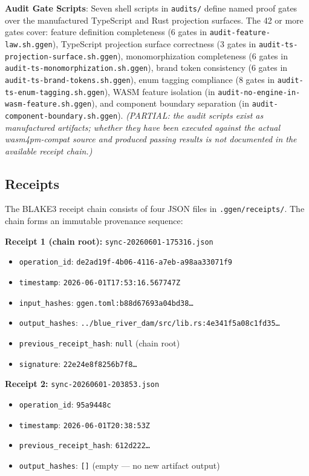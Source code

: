 \textbf{Audit Gate Scripts}: Seven shell scripts in \texttt{audits/} define named proof gates
over the manufactured TypeScript and Rust projection surfaces. The 42 or more gates cover: feature
definition completeness (6 gates in \texttt{audit-feature-law.sh.ggen}), TypeScript projection
surface correctness (3 gates in \texttt{audit-ts-projection-surface.sh.ggen}), monomorphization
completeness (6 gates in \texttt{audit-ts-monomorphization.sh.ggen}), brand token consistency (6
gates in \texttt{audit-ts-brand-tokens.sh.ggen}), enum tagging compliance (8 gates in
\texttt{audit-ts-enum-tagging.sh.ggen}), WASM feature isolation (in
\texttt{audit-no-engine-in-wasm-feature.sh.ggen}), and component boundary separation (in
\texttt{audit-component-boundary.sh.ggen}). \textit{(PARTIAL: the audit scripts exist as
manufactured artifacts; whether they have been executed against the actual wasm4pm-compat
source and produced passing results is not documented in the available receipt chain.)}

\subsection{Receipts}
\label{sec:ggen-evidence-receipts}

The BLAKE3 receipt chain consists of four JSON files in \texttt{.ggen/receipts/}. The chain forms
an immutable provenance sequence:

\textbf{Receipt 1 (chain root):} \texttt{sync-20260601-175316.json}
\begin{itemize}
  \item \texttt{operation\_id}: \texttt{de2ad19f-4b06-4116-a7eb-a98aa33071f9}
  \item \texttt{timestamp}: \texttt{2026-06-01T17:53:16.567747Z}
  \item \texttt{input\_hashes}: \texttt{ggen.toml:b88d67693a04bd38\ldots}
  \item \texttt{output\_hashes}: \texttt{../blue\_river\_dam/src/lib.rs:4e341f5a08c1fd35\ldots}
  \item \texttt{previous\_receipt\_hash}: \texttt{null} (chain root)
  \item \texttt{signature}: \texttt{22e24e8f8256b7f8\ldots}
\end{itemize}

\textbf{Receipt 2:} \texttt{sync-20260601-203853.json}
\begin{itemize}
  \item \texttt{operation\_id}: \texttt{95a9448c}
  \item \texttt{timestamp}: \texttt{2026-06-01T20:38:53Z}
  \item \texttt{previous\_receipt\_hash}: \texttt{612d222\ldots}
  \item \texttt{output\_hashes}: \texttt{[]} (empty --- no new artifact output)
\end{itemize}

